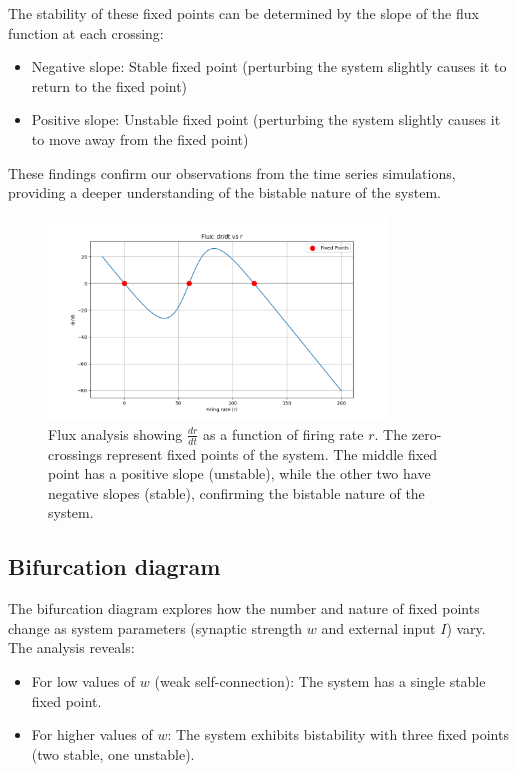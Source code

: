 \documentclass{article}
\begin{document}
The stability of these fixed points can be determined by the slope of the flux function at each crossing:
\begin{itemize}
    \item Negative slope: Stable fixed point (perturbing the system slightly causes it to return to the fixed point)
    \item Positive slope: Unstable fixed point (perturbing the system slightly causes it to move away from the fixed point)
\end{itemize}

These findings confirm our observations from the time series simulations, providing a deeper understanding of the bistable nature of the system.

\begin{figure}[H]
    \centering
    \includegraphics[width=0.8\textwidth]{flux_analysis.png}
    \caption{Flux analysis showing $\frac{dr}{dt}$ as a function of firing rate $r$. The zero-crossings represent fixed points of the system. The middle fixed point has a positive slope (unstable), while the other two have negative slopes (stable), confirming the bistable nature of the system.}
    \label{fig:flux}
\end{figure}


\subsection{Bifurcation diagram}

The bifurcation diagram explores how the number and nature of fixed points change as system parameters (synaptic strength $w$ and external input $I$) vary. The analysis reveals:

\begin{itemize}
    \item For low values of $w$ (weak self-connection): The system has a single stable fixed point.
    \item For higher values of $w$: The system exhibits bistability with three fixed points (two stable, one unstable).
\end{itemize}
\end{document}
